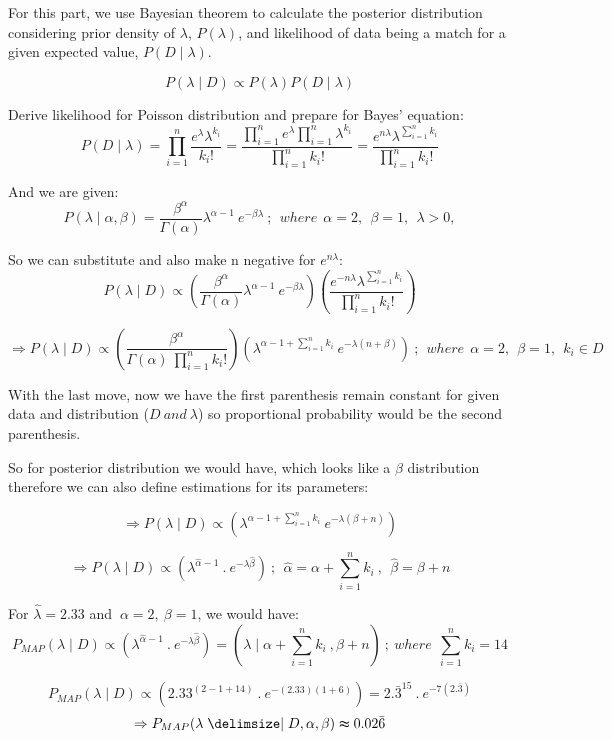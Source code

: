 \documentclass{homeworg}
\begin{document}
For this part, we use Bayesian theorem to calculate the posterior distribution
considering prior density of $\lambda$, $P(\lambda)$, and likelihood of data
being a match for a given expected value, $P(D \mid \lambda)$.

$$
P(\lambda \mid D) \propto P(\lambda)P(D \mid \lambda)
$$

Derive likelihood for Poisson distribution and prepare for Bayes' equation:
$$
P(D \mid \lambda) = \prod_{i = 1}^{n} \frac{e^{\lambda} \lambda^{k_i}}{k_{i}!}
= \frac{\prod_{i=1}^{n}e^{\lambda}\prod_{i=1}^{n}\lambda^{k_i}}{\prod_{i=1}^{n}k_{i}!}
= \frac{e^{n\lambda}\lambda^{\sum_{i=1}^{n}k_i}}{\prod_{i=1}^{n}k_{i}!}
$$

And we are given:
$$
P(\lambda \mid \alpha, \beta) = \frac{\beta^{\alpha}}{\Gamma(\alpha)}\lambda^{\alpha-1}~e^{-\beta\lambda}
~;~~where ~~\alpha= 2, ~~\beta=1, ~~\lambda>0,
$$

So we can substitute and also make n negative for $e^{n\lambda}$:
$$
P(\lambda \mid D) \propto
(\frac{\beta^{\alpha}}{\Gamma(\alpha)} \lambda^{\alpha-1}~e^{-\beta\lambda})
(\frac{e^{-n\lambda}\lambda^{\sum_{i=1}^{n}k_i}}{\prod_{i=1}^{n}k_{i}!})
$$

$$
\Rightarrow
P(\lambda \mid D) \propto
(\frac{\beta^{\alpha}}{\Gamma(\alpha)~\prod_{i=1}^{n}k_{i}!})
(\lambda^{\alpha-1+\sum_{i=1}^{n}k_i}~e^{-\lambda(n+\beta)})
~;~~where ~~\alpha= 2, ~~\beta=1,~~ k_i \in D
$$

With the last move, now we have the first parenthesis remain constant for given
data and distribution ($D~and~\lambda$) so proportional probability would be
the second parenthesis.

So for posterior distribution we would have, which looks like a $\beta$
distribution therefore we can also define estimations for its parameters:

$$
\Rightarrow
P(\lambda \mid D) \propto (\lambda^{\alpha-1+\sum_{i=1}^{n}k_i}~e^{-\lambda(\beta+n)})
$$

$$
\Rightarrow
P(\lambda \mid D) \propto (\lambda^{\hat{\alpha}-1}~.~e^{-\lambda\hat{\beta}})~;~~
\hat{\alpha} =\alpha +\sum_{i=1}^{n}k_i~, ~~\hat{\beta} = \beta+n
$$

\newpage

For $\hat{\lambda} = 2.33$ and $~\alpha= 2, ~\beta=1$, we would have:
$$
P_{MAP}(\lambda \mid D) \propto (\lambda^{\hat{\alpha}-1}~.~e^{-\lambda\hat{\beta}})
= (\lambda \mid \alpha +\sum_{i=1}^{n}k_i~, \beta+n)~;
~where~~ \sum_{i=1}^{n}k_i= 14
$$

$$
P_{MAP}(\lambda \mid D) \propto (2.33^{(2-1+14)}~.~e^{-(2.33)(1 + 6)}) =
2.\bar{3}^{15}~.~e^{-7(2.\bar{3})}
$$
$$
\Rightarrow P_{MAP}(\lambda \mid D, \alpha, \beta) \thickapprox  0.02\bar{6}
$$
\exercise*
\end{document}
